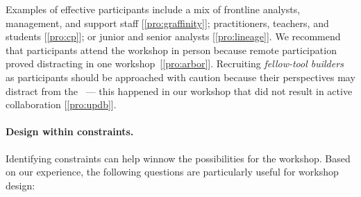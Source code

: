 Examples of effective participants include a mix of frontline analysts, management, and support staff [\ref{pro:graffinity}]; practitioners, teachers, and students [\ref{pro:cp}]; or junior and senior analysts [\ref{pro:lineage}]. We recommend that participants attend the workshop in person because remote participation proved distracting in one workshop~[\ref{pro:arbor}]. Recruiting {\it fellow-tool builders}~\cite{Sedlmair2012} as participants should be approached with caution because their perspectives may distract from the \topic~--- this happened in our workshop that did not result in active collaboration [\ref{pro:updb}].

\paragraph{Design within constraints.} Identifying constraints can help winnow the possibilities for the workshop. Based on our experience, the following questions are particularly useful for workshop design:

